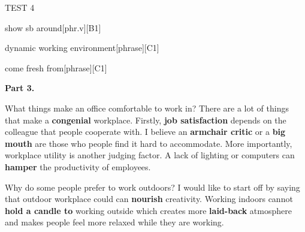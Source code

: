\begin{glossarymc}[Cambridge 12]
\begin{test}{TEST 4}
\begin{VocabExplain}[Part 2]
            \begin{ExplainCard}{show sb around}[phr.v][B1]
            \end{ExplainCard}

            \begin{ExplainCard}{dynamic working environment}[phrase][C1]
            \end{ExplainCard}

            \begin{ExplainCard}{come fresh from}[phrase][C1]
            \end{ExplainCard}
        \end{VocabExplain}

    \noindent
    \textbf{Part 3.}
    \begin{qa}{What things make an office comfortable to work in?}
    There are a lot of things that make a \textbf{congenial} workplace. Firstly, \textbf{job satisfaction} depends on the colleague that people cooperate with. I believe an \textbf{armchair critic} or a \textbf{big mouth} are those who people find it hard to accommodate. More importantly, workplace utility is another judging factor. A lack of lighting or computers can \textbf{hamper} the productivity of employees.
    \end{qa}

    \begin{qa}{Why do some people prefer to work outdoors?}
    I would like to start off by saying that outdoor workplace could can \textbf{nourish} creativity. Working indoors cannot \textbf{hold a candle to} working outside which creates more \textbf{laid-back} atmosphere and makes people feel more relaxed while they are working.
    \end{qa}


\end{test}
\end{glossarymc}
